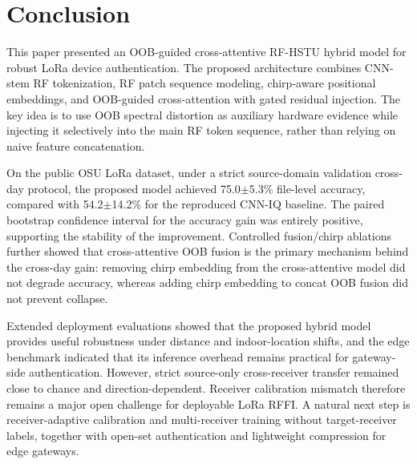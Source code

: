 \section{Conclusion}
\label{sec:conclusion}

This paper presented an OOB-guided cross-attentive RF-HSTU hybrid model for robust LoRa device authentication. The proposed architecture combines CNN-stem RF tokenization, RF patch sequence modeling, chirp-aware positional embeddings, and OOB-guided cross-attention with gated residual injection. The key idea is to use OOB spectral distortion as auxiliary hardware evidence while injecting it selectively into the main RF token sequence, rather than relying on naive feature concatenation.

On the public OSU LoRa dataset, under a strict source-domain validation cross-day protocol, the proposed model achieved 75.0$\pm$5.3\% file-level accuracy, compared with 54.2$\pm$14.2\% for the reproduced CNN-IQ baseline. The paired bootstrap confidence interval for the accuracy gain was entirely positive, supporting the stability of the improvement. Controlled fusion/chirp ablations further showed that cross-attentive OOB fusion is the primary mechanism behind the cross-day gain: removing chirp embedding from the cross-attentive model did not degrade accuracy, whereas adding chirp embedding to concat OOB fusion did not prevent collapse.

Extended deployment evaluations showed that the proposed hybrid model provides useful robustness under distance and indoor-location shifts, and the edge benchmark indicated that its inference overhead remains practical for gateway-side authentication. However, strict source-only cross-receiver transfer remained close to chance and direction-dependent. Receiver calibration mismatch therefore remains a major open challenge for deployable LoRa RFFI. A natural next step is receiver-adaptive calibration and multi-receiver training without target-receiver labels, together with open-set authentication and lightweight compression for edge gateways.
